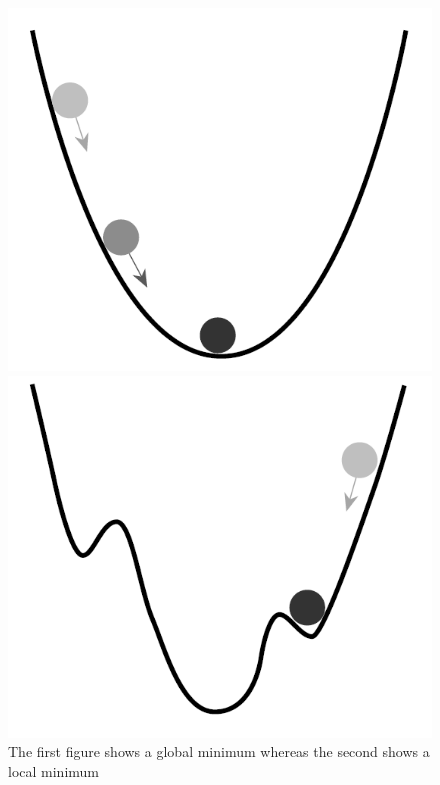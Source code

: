 \begin{figure}
\centering
\begin{minipage}{.5\textwidth}
  \centering
  \includegraphics[width=.4\linewidth]{billeder/globalMinimum.png}
\end{minipage}%
\begin{minipage}{.5\textwidth}
  \centering
  \includegraphics[width=.4\linewidth]{billeder/localMinimum.png}
\end{minipage}
\caption{The first figure shows a global minimum whereas the second shows a local minimum \cite[P. 318]{buckland2002ai}}
\label{fig:localMinimum}
\end{figure}

